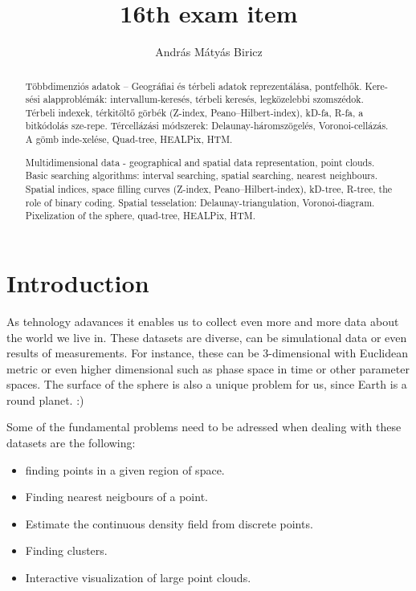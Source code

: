 \documentclass[12pt]{article}
\theoremstyle{plain}
\begin{document}
\title{16th exam item}
\author{András Mátyás Biricz}

\maketitle

\begin{abstract}
	\centering
    Többdimenziós adatok – Geográfiai és térbeli adatok reprezentálása, pontfelhők. Kere-sési alapproblémák: intervallum-keresés, térbeli keresés, legközelebbi szomszédok. Térbeli indexek, térkitöltő görbék (Z-index, Peano–Hilbert-index), kD-fa, R-fa, a bitkódolás sze-repe. Tércellázási módszerek: Delaunay-háromszögelés, Voronoi-cellázás. A gömb inde-xelése, Quad-tree, HEALPix, HTM.

    Multidimensional data - geographical and spatial data representation, point clouds. Basic searching algorithms: interval searching, spatial searching, nearest neighbours. Spatial indices, space filling curves (Z-index, Peano–Hilbert-index), kD-tree, R-tree, the role of binary coding. Spatial tesselation: Delaunay-triangulation, Voronoi-diagram. Pixelization of the sphere, quad-tree, HEALPix, HTM.
\end{abstract}

\vfill

\tableofcontents

\newpage

\section{Introduction}

As tehnology adavances it enables us to collect even more and more data about the world we live in. These datasets are diverse, can be simulational data or even results of measurements. For instance, these can be 3-dimensional with Euclidean metric or even higher dimensional such as phase space in time or other parameter spaces. The surface of the sphere is also a unique problem for us, since Earth is a round planet. :)

Some of the fundamental problems need to be adressed when dealing with these datasets are the following: 

\begin{itemize}
	\item finding points in a given region of space.
	\item Finding nearest neigbours of a point.
	\item Estimate the continuous density field from discrete points.
	\item Finding clusters.
	\item Interactive visualization of large point clouds.
\end{itemize}
\end{document}
